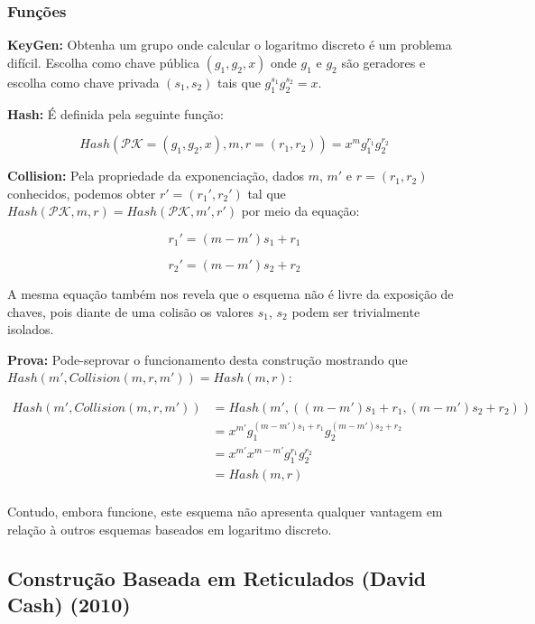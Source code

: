 \documentclass[a4paper]{article}
\begin{document}
    \subsubsection{Funções}
    
    \textbf{KeyGen: } Obtenha um grupo onde calcular o logaritmo discreto
    é um problema difícil. Escolha como chave pública $(g_1, g_2, x)$ onde
    $g_1$ e $g_2$ são geradores e escolha como chave privada $(s_1, s_2)$
    tais que $g_1^{s_1}g_2^{s_2} = x$.
    
    \textbf{Hash: } É definida pela seguinte função:
    
    $$
    Hash(\mathcal{PK}=(g_1, g_2, x), m, r=(r_1, r_2)) = x^mg_1^{r_1}g_2^{r_2}
    $$
    
    \textbf{Collision: } Pela propriedade da exponenciação, dados $m$,
    $m'$ e $r=(r_1, r_2)$ conhecidos, podemos obter $r'=(r_1', r_2')$ tal
    que $Hash(\mathcal{PK}, m, r) = Hash(\mathcal{PK}, m', r')$ por meio
    da equação:
    
    $$
    r_1' = (m-m')s_1+r_1
    $$
    
    $$
    r_2' = (m-m')s_2+r_2
    $$
    
    A mesma equação também nos revela que o esquema não é livre da
    exposição de chaves, pois diante de uma colisão os valores $s_1$,
    $s_2$ podem ser trivialmente isolados.
    
    \textbf{Prova: }Pode-seprovar o funcionamento desta construção
    mostrando que $Hash(m', Collision(m, r, m')) = Hash(m, r)$:
    
    \begin{equation}
    \begin{split}
      Hash(m', Collision(m, r, m'))
      &= Hash(m', ((m-m')s_1+r_1, (m-m')s_2+r_2))\\
      &= x^{m'}g_1^{(m-m')s_1+r_1}g_2^{(m-m')s_2+r_2}\\
      &= x^{m'}x^{m-m'}g_1^{r_1}g_2^{r_2}\\
      &= Hash(m, r)\\
    \end{split}
    \end{equation}
    
    Contudo, embora funcione, este esquema não apresenta qualquer vantagem
    em relação à outros esquemas baseados em logaritmo discreto.
    
    \subsection{Construção Baseada em Reticulados (David Cash)
      (2010)\cite{reticulado}}
    
\end{document}
